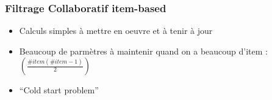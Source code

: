 \documentclass{formation}
\begin{document}
\begin{frame}
  \frametitle{Filtrage Collaboratif item-based}
  \begin{itemize}[<+->]
  \item Calculs simples à mettre en oeuvre et à tenir à jour \\
  \item Beaucoup de parmètres à maintenir quand on a beaucoup d'item : $\left(\frac{\#item(\#item-1)}{2}\right)$
  \item ``Cold start problem''
  \end{itemize}
\end{frame}
\end{document}
